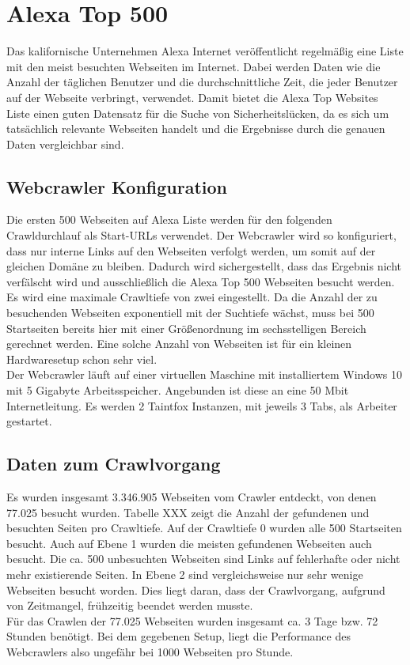 \section{Alexa Top 500}
Das kalifornische Unternehmen Alexa Internet veröffentlicht regelmäßig eine Liste mit den meist besuchten Webseiten im Internet. Dabei werden Daten wie die Anzahl der täglichen Benutzer und die durchschnittliche Zeit, die jeder Benutzer auf der Webseite verbringt, verwendet. Damit bietet die Alexa Top Websites Liste einen guten Datensatz für die Suche von Sicherheitslücken, da es sich um tatsächlich relevante Webseiten handelt und die Ergebnisse durch die genauen Daten vergleichbar sind.\\
\subsection{Webcrawler Konfiguration}
Die ersten 500 Webseiten auf Alexa Liste werden für den folgenden Crawldurchlauf als Start-URLs verwendet. Der Webcrawler wird so konfiguriert, dass nur interne Links auf den Webseiten verfolgt werden, um somit auf der gleichen Domäne zu bleiben. Dadurch wird sichergestellt, dass das Ergebnis nicht verfälscht wird und ausschließlich die Alexa Top 500 Webseiten besucht werden. \\
Es wird eine maximale Crawltiefe von zwei eingestellt. Da die Anzahl der zu besuchenden Webseiten exponentiell mit der Suchtiefe wächst, muss bei 500 Startseiten bereits hier mit einer Größenordnung im sechsstelligen Bereich gerechnet werden. Eine solche Anzahl von Webseiten ist für ein kleinen Hardwaresetup schon sehr viel.\\
Der Webcrawler läuft auf einer virtuellen Maschine mit installiertem Windows 10 mit 5 Gigabyte Arbeitsspeicher. Angebunden ist diese an eine 50 Mbit Internetleitung. Es werden 2 Taintfox Instanzen, mit jeweils 3 Tabs, als Arbeiter gestartet.
\subsection{Daten zum Crawlvorgang}
Es wurden insgesamt 3.346.905 Webseiten vom Crawler entdeckt, von denen 77.025 besucht wurden. Tabelle XXX zeigt die Anzahl der gefundenen und besuchten Seiten pro Crawltiefe. Auf der Crawltiefe 0 wurden alle 500 Startseiten besucht. Auch auf Ebene 1 wurden die meisten gefundenen Webseiten auch besucht. Die ca. 500 unbesuchten Webseiten sind Links auf fehlerhafte oder nicht mehr existierende Seiten. In Ebene 2 sind vergleichsweise nur sehr wenige Webseiten besucht worden. Dies liegt daran, dass der Crawlvorgang, aufgrund von Zeitmangel, frühzeitig beendet werden musste. \\
Für das Crawlen der 77.025 Webseiten wurden insgesamt ca. 3 Tage bzw. 72 Stunden benötigt. Bei dem gegebenen Setup, liegt die Performance des Webcrawlers also ungefähr bei 1000 Webseiten pro Stunde.


